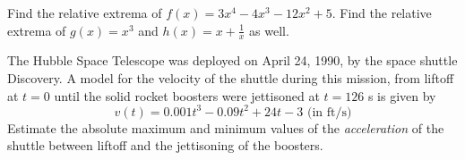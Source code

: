 \documentclass[12pt, a4paper]{article}
\begin{document}
\vspace{-2.5in}
\begin{ex}
  Find the relative extrema of \(f(x) = 3x^4 - 4x^3 - 12x^2 +
  5\). Find the relative extrema of \(g(x) = x^3\) and \(h(x) = x +
  \frac{1}{x}\) as well.
\end{ex}
\begin{ex}
  The Hubble Space Telescope was deployed on April 24, 1990, by the
  space shuttle Discovery. A model for the velocity of the
  shuttle during this mission, from liftoff at \(t=0\) until the solid
  rocket boosters were jettisoned at \(t = 126\) s is given by \[
    v(t) = 0.001 t^3 - 0.09t^2 + 24t - 3 \text{ (in ft/s)}
  \]
  Estimate the absolute maximum and minimum values of the
  \emph{acceleration} of the shuttle between liftoff and the
  jettisoning of the boosters.
\end{ex}

\end{document}
